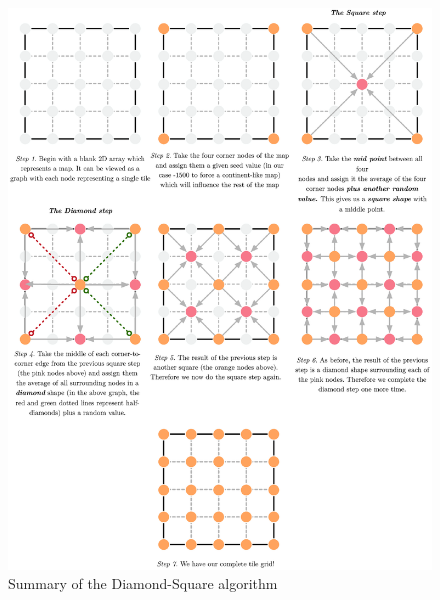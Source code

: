 \documentclass{article}
\begin{document}
\begin{figure}[H]
	\centering
	\includegraphics[width=0.9\linewidth,trim=4 4 4 4,clip]{diamondsquare.eps}
	\renewcommand{\figurename}{Example}
	\caption{Summary of the Diamond-Square algorithm}\label{fig:graph}
\end{figure}
	
\end{document}
